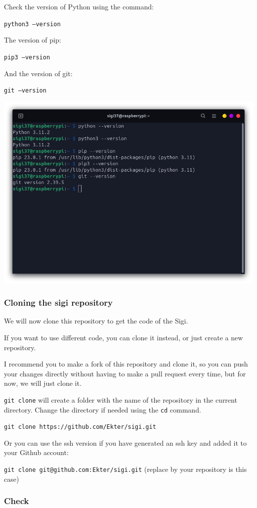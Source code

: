 \documentclass{article}
\begin{document}
Check the version of Python using the command:

\texttt{python3 --version}

The version of pip:

\texttt{pip3 --version}

And the version of git:

\texttt{git --version}

\includegraphics[scale=0.37]{img/all_versions.png}

\subsubsection{Cloning the sigi repository}

We will now clone this repository to get the code of the Sigi.

If you want to use different code, you can clone it instead, or just create a new repository.

I recommend you to make a fork of this repository and clone it, so you can push your changes
directly without having to make a pull request every time, but for now, we will just clone it.

\texttt{git clone} will create a folder with the name of the repository in the current directory.
Change the directory if needed using the \texttt{cd} command.

\texttt{git clone https://github.com/Ekter/sigi.git}

Or you can use the ssh version if you have generated an ssh key and added it to your Github
account:

\texttt{git clone git@github.com:Ekter/sigi.git}
(replace by your repository is this case)

\subsubsection{Check}
\end{document}
